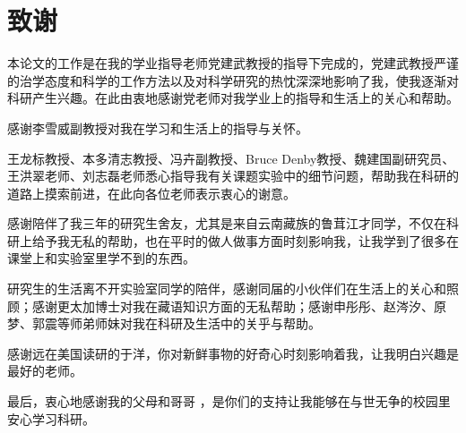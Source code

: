 
\chapter*{致\quad 谢}

\vspace*{1cm}
本论文的工作是在我的学业指导老师党建武教授的指导下完成的，党建武教授严谨的治学态度和科学的工作方法以及对科学研究的热忱深深地影响了我，使我逐渐对科研产生兴趣。在此由衷地感谢党老师对我学业上的指导和生活上的关心和帮助。

感谢李雪威副教授对我在学习和生活上的指导与关怀。

王龙标教授、本多清志教授、冯卉副教授、Bruce Denby教授、魏建国副研究员、王洪翠老师、刘志磊老师悉心指导我有关课题实验中的细节问题，帮助我在科研的道路上摸索前进，在此向各位老师表示衷心的谢意。

感谢陪伴了我三年的研究生舍友，尤其是来自云南藏族的鲁茸江才同学，不仅在科研上给予我无私的帮助，也在平时的做人做事方面时刻影响我，让我学到了很多在课堂上和实验室里学不到的东西。

研究生的生活离不开实验室同学的陪伴，感谢同届的小伙伴们在生活上的关心和照顾；感谢更太加博士对我在藏语知识方面的无私帮助；感谢申彤彤、赵涔汐、原梦、郭震等师弟师妹对我在科研及生活中的关乎与帮助。

感谢远在美国读研的于洋，你对新鲜事物的好奇心时刻影响着我，让我明白兴趣是最好的老师。

最后，衷心地感谢我的父母和哥哥 ，是你们的支持让我能够在与世无争的校园里安心学习科研。

